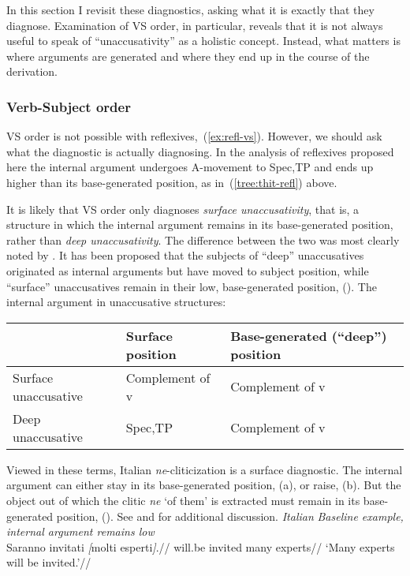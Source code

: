 In this section I revisit these diagnostics, asking what it is exactly that they diagnose. Examination of VS order, in particular, reveals that it is not always useful to speak of ``unaccusativity'' as a holistic concept. Instead, what matters is where arguments are generated and where they end up in the course of the derivation.

		\subsubsection{Verb-Subject order}
VS order is not possible with reflexives,~(\ref{ex:refl-vs}). However, we should ask what the diagnostic is actually diagnosing. In the analysis of reflexives proposed here the internal argument undergoes A-movement to Spec,TP and ends up higher than its base-generated position, as in~(\ref{tree:thit-refl}) above.

It is likely that VS order only diagnoses \emph{surface unaccusativity}, that is, a structure in which the internal argument remains in its base-generated position, rather than \emph{deep unaccusativity}. The difference between the two was most clearly noted by \cite{unaccusativity95}. It has been proposed that the subjects of ``deep'' unaccusatives originated as internal arguments but have moved to subject position, while ``surface'' unaccusatives remain in their low, base-generated position, (\nextx).
\ex The internal argument in unaccusative structures:\\
\begin{tabular}{l|ll}
	& Surface position & Base-generated (``deep'') position \\\hline
	Surface unaccusative & Complement of v & Complement of v \\\hline
	Deep unaccusative & Spec,TP & Complement of v\\
\end{tabular}
\xe

Viewed in these terms, Italian \emph{ne}-cliticization \citep{burzio86} is a surface diagnostic. The internal argument can either stay in its base-generated position, (\nextx a), or raise, (\nextx b). But the object out of which the clitic \emph{ne} `of them' is extracted must remain in its base-generated position, (\anextx). See \citet[23]{burzio86} and \citet[32]{irwinphd} for additional discussion.
\pex\label{ex:burzio}\textit{Italian}
\a \textit{Baseline example, internal argument remains low}\\
\begingl
\gla Saranno invitati \emph{[}molti esperti\emph{]}.//
\glb will.be invited many experts//
\glft `Many experts will be invited.'//
\endgl

